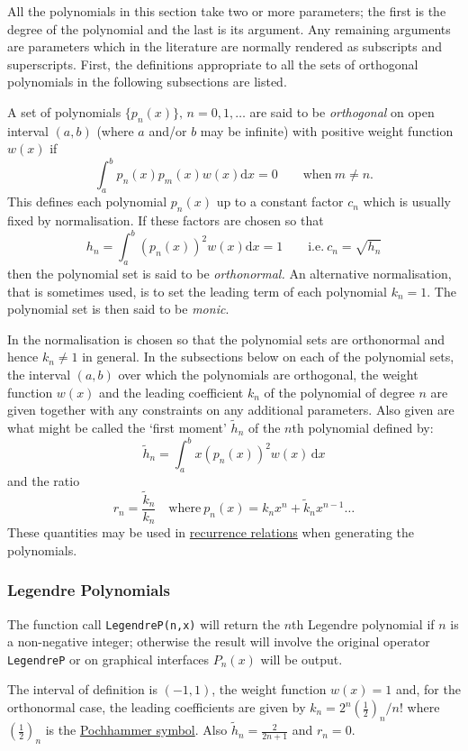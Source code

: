 All the polynomials in this section take two or more parameters; the first is
the degree of the polynomial and the last is its argument. Any remaining
arguments are parameters which in the literature are normally rendered as
subscripts and superscripts. First, the definitions appropriate to all the sets
of orthogonal polynomials in the following subsections are listed.

A set of polynomials $\{p_n(x)\},\, n=0,1,\ldots$
are said to be \emph{orthogonal} on open interval $(a, b)$
(where $a$ and/or $b$ may be infinite) with positive weight function $w(x)$ if
\[\int_a^b p_n(x)p_m(x)w(x) \mathrm{d}x = 0 \qquad \mbox{when}\ m \neq n.\]
This defines each polynomial $p_n(x)$ up to a constant factor $c_n$ which is
usually fixed by normalisation. If these factors are chosen so that
\[h_n=\int_a^b (p_n(x))^2 w(x) \mathrm{d}x = 1\qquad\mbox{i.e.}\
c_n=\sqrt{h_n}\]
then the polynomial set is said to be \emph{orthonormal.}
An alternative normalisation, that is sometimes used, is to set the leading term
of each polynomial $k_n = 1$. The polynomial set is then said to be
\emph{monic}.

In \REDUCE the normalisation is chosen so that the polynomial
sets are orthonormal and hence $k_n \neq 1$ in general. In the subsections below
on each of the polynomial sets, the interval $(a,b)$ over which the polynomials
are orthogonal, the weight function $w(x)$ and the leading coefficient $k_n$ of
the polynomial of degree $n$ are given together with any constraints on any
additional parameters. Also given are what might be called the `first moment'
$\tilde{h}_n$ of the $n$th polynomial defined by:
\[\tilde{h}_n = \int_a^b x  (p_n(x))^2 w(x) \,\mathrm{d}x\]
and the ratio
\[r_n = \frac{\tilde{k}_n}{k_n}\quad\mbox{where}\ p_n(x) =
k_n x^n + \tilde{k}_n x^{n-1} \ldots\]
These quantities may be used in \href{https://dlmf.nist.gov/18.2#iv}
{recurrence relations} when generating the polynomials.

\subsubsection{Legendre Polynomials}
\hypertarget{LEGENDREP}{}
The function call \texttt{LegendreP(n,x)} will return the $n$th Legendre
polynomial if $n$ is a non-negative integer; otherwise the result will involve
the original operator \texttt{LegendreP} or on graphical interfaces $P_n(x)$
will be output.

The interval of definition is $(-1, 1)$, the weight function $w(x)=1$ and,
for the orthonormal case, the leading coefficients are given by
$k_n=2^n (\frac{1}{2})_n/n!$ where $(\frac{1}{2})_n$ is the
\hyperlink{POCH}{Pochhammer symbol}.
Also $\tilde{h}_n = \frac{2}{2 n +1}$ and $r_n =0$.

